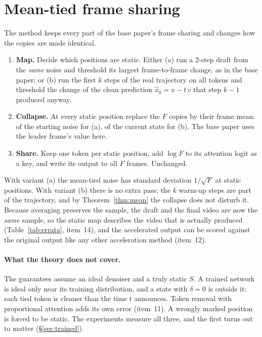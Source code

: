 \section{Mean-tied frame sharing}
\label{sec:method}

The method keeps every part of the base paper's frame sharing and changes how the copies are made identical.

\begin{enumerate}[leftmargin=1.4em,itemsep=1pt,topsep=2pt]
\item \textbf{Map.} Decide which positions are static. Either (a) run a 2-step draft from the \emph{same} noise and threshold its largest frame-to-frame change, as in the base paper; or (b) run the first $k$ steps of the real trajectory on all tokens and threshold the change of the clean prediction $\hat x_0=x-t\,v$ that step $k{-}1$ produced anyway.
\item \textbf{Collapse.} At every static position replace the $F$ copies by their frame mean: of the starting noise for (a), of the current state for (b). The base paper uses the leader frame's value here.
\item \textbf{Share.} Keep one token per static position, add $\log F$ to its attention logit as a key, and write its output to all $F$ frames. Unchanged.
\end{enumerate}

With variant (a) the mean-tied noise has standard deviation $1/\sqrt F$ at static positions.
With variant (b) there is no extra pass: the $k$ warm-up steps are part of the trajectory, and by Theorem~\ref{thm:mean} the collapse does not disturb it.
Because averaging preserves the sample, the draft and the final video are now the \emph{same} sample, so the static map describes the video that is actually produced (Table~\ref{tab:errata}, item~14), and the accelerated output can be scored against the original output like any other acceleration method (item~12).

\paragraph{What the theory does not cover.}
The guarantees assume an ideal denoiser and a truly static $S$.
A trained network is ideal only near its training distribution, and a state with $\delta=0$ is outside it: each tied token is cleaner than the time $t$ announces.
Token removal with proportional attention adds its own error (item~11).
A wrongly marked position is forced to be static.
The experiments measure all three, and the first turns out to matter (\S\ref{sec:trained}).

